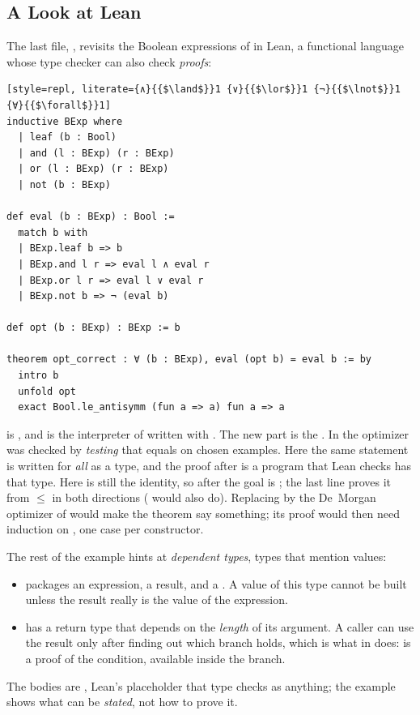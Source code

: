\subsection{A Look at Lean}

The last file, , revisits the Boolean expressions of  in Lean, a functional language whose type checker can also check \emph{proofs}:
\begin{lstlisting}[style=repl, literate={∧}{{$\land$}}1 {∨}{{$\lor$}}1 {¬}{{$\lnot$}}1 {∀}{{$\forall$}}1]
inductive BExp where
  | leaf (b : Bool)
  | and (l : BExp) (r : BExp)
  | or (l : BExp) (r : BExp)
  | not (b : BExp)

def eval (b : BExp) : Bool :=
  match b with
  | BExp.leaf b => b
  | BExp.and l r => eval l ∧ eval r
  | BExp.or l r => eval l ∨ eval r
  | BExp.not b => ¬ (eval b)

def opt (b : BExp) : BExp := b

theorem opt_correct : ∀ (b : BExp), eval (opt b) = eval b := by
  intro b
  unfold opt
  exact Bool.le_antisymm (fun a => a) fun a => a
\end{lstlisting}
 is , and  is the interpreter of  written with . The new part is the . In  the optimizer was checked by \emph{testing} that  equals  on chosen examples. Here the same statement is written for \emph{all}  as a type, and the proof after  is a program that Lean checks has that type. Here  is still the identity, so after  the goal is ; the last line proves it from $\le$ in both directions ( would also do). Replacing  by the De~Morgan optimizer of  would make the theorem say something; its proof would then need induction on , one case per constructor.

The rest of the example hints at \emph{dependent types}, types that mention values:
\begin{itemize}
  \item {} packages an expression, a result, and a . A value of this type cannot be built unless the result really is the value of the expression.
  \item {} has a return type that depends on the \emph{length} of its argument. A caller can use the result only after finding out which branch holds, which is what  in  does:  is a proof of the condition, available inside the branch.
\end{itemize}
The bodies are , Lean's placeholder that type checks as anything; the example shows what can be \emph{stated}, not how to prove it.
